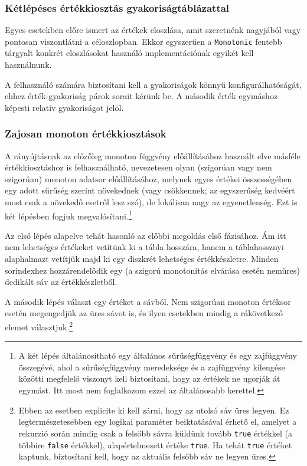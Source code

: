 \documentclass[
    parspace,
    noindent,
    nohyp,
]{elteiktdk}[2023/04/10]
\begin{document}
\subsubsection{Kétlépéses értékkiosztás gyakoriságtáblázattal}

Egyes esetekben előre ismert az értékek eloszlása,
amit szeretnénk nagyjából vagy pontosan viszontlátni a céloszlopban.
Ekkor egyszerűen a \texttt{Monotonic} fentebb tárgyalt konkrét eloszlásokat használó
implementációnak egyikét kell használnunk.

A felhasználó számára biztosítani kell a gyakoriságok könnyű konfigurálhatóságát,
ehhez érték-gyakoriság párok sorait kérünk be.
A második érték egymáshoz képesti relatív gyakoriságot jelöl.

\subsubsection{Zajosan monoton értékkiosztások}

A rányújtásnak az előzőleg monoton függvény előállításához használt elve
másféle értékkiosztáshoz is felhasználható,
nevezetesen olyan (szigorúan vagy nem szigorúan) monoton adatsor előállításához,
melynek egyes értékei összességében egy adott sűrűség szerint növekednek
(vagy csökkennek; az egyszerűség kedvéért most csak a növekedő esetről lesz szó),
de lokálisan nagy az egyenetlenség.
Ezt is két lépésben fogjuk megvalósítani.\footnote{
  A két lépés általánosítható egy általános sűrűségfüggvény és egy zajfüggvény összegévé,
  ahol a sűrűségfüggvény meredeksége és a zajfüggvény kilengése közötti megfelelő viszonyt kell biztosítani,
  hogy az értékek ne ugorják át egymást.
  Itt most nem foglalkozom ezzel az általánosabb kerettel.
}

Az első lépés alapelve tehát hasonló az előbbi megoldás első fázisához.
Ám itt nem lehetséges értékeket vetítünk ki a tábla hosszára,
hanem a táblahossznyi alaphalmazt vetítjük majd ki egy diszkrét lehetséges értékkészletre.
Minden sorindexhez hozzárendelődik egy (a szigorú monotonitás elvárása esetén nemüres)
dedikált sáv az értékkészletből.

A második lépés választ egy értéket a sávból.
Nem szigorúan monoton értéksor esetén megengedjük az üres sávot is,
és ilyen esetekben mindig a rákövetkező elemet választjuk.\footnote{
  Ebben az esetben explicite ki kell zárni, hogy az utolsó sáv üres legyen.
  Ez legtermészetesebben egy logikai paraméter beiktatásával érhető el,
  amelyet a rekurzió során mindig csak a felsőbb sávra küldünk tovább \texttt{true} értékkel
  (a többire \texttt{false} értékkel),
  alapértelmezett értéke \texttt{true}.
  Ha tehát \texttt{true} értéket kaptunk, biztosítani kell, hogy az aktuális felsőbb sáv ne legyen üres.
}
\end{document}
